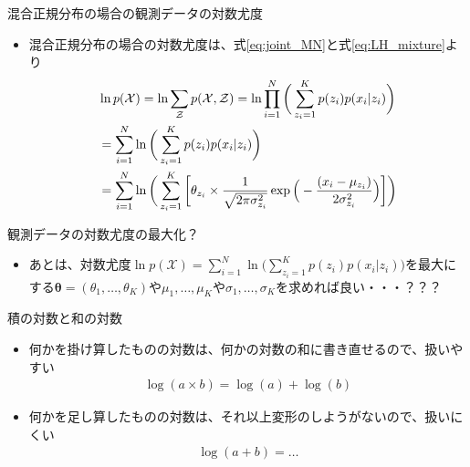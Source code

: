 \documentclass[aspectratio=169,unicode,dvipdfmx,14pt]{beamer}
\begin{document}
\begin{frame}{混合正規分布の場合の観測データの対数尤度}
\begin{itemize}
\item 混合正規分布の場合の対数尤度は、式\eqref{eq:joint_MN}と式\eqref{eq:LH_mixture}より
\vspace{-.1in}
\begin{align}
& \ln p(\mathcal{X}) = \ln \sum_{\mathcal{Z}} p(\mathcal{X}, \mathcal{Z})
= \ln \prod_{i=1}^N \bigg( \sum_{z_i=1}^K p(z_i) p(x_i | z_i) \bigg)
\notag \\ &
= \sum_{i=1}^N \ln \bigg( \sum_{z_i=1}^K p(z_i) p(x_i | z_i) \bigg)
\notag \\ &
= \sum_{i=1}^N \ln \bigg( \sum_{z_i=1}^K \bigg[ \theta_{z_i} \times \frac{1}{\sqrt{2\pi\sigma_{z_i}^2}}\exp\Big( - \frac{(x_i - \mu_{z_i})}{2\sigma_{z_i}^2} \Big) \bigg] \bigg)
\end{align}
\end{itemize}
\end{frame}

\begin{frame}{観測データの対数尤度の最大化？}
\begin{itemize}
\item あとは、対数尤度$\ln p(\mathcal{X}) = \sum_{i=1}^N \ln \Big( \sum_{z_i=1}^K p(z_i) p(x_i | z_i) \Big)$を最大にする$\bm{\theta}=(\theta_1,\ldots,\theta_K)$や$\mu_1,\ldots,\mu_K$や$\sigma_1,\ldots,\sigma_K$を求めれば良い・・・？？？
\end{itemize}
\end{frame}


\begin{frame}{積の対数と和の対数}
\begin{itemize}
\item 何かを掛け算したものの対数は、何かの対数の和に書き直せるので、扱いやすい
\begin{align}
\log(a \times b) = \log(a) + \log(b)
\end{align}
\item 何かを足し算したものの対数は、それ以上変形のしようがないので、扱いにくい
\begin{align}
\log(a + b) = \ldots
\end{align}\end{itemize}
\end{frame}
\end{document}
